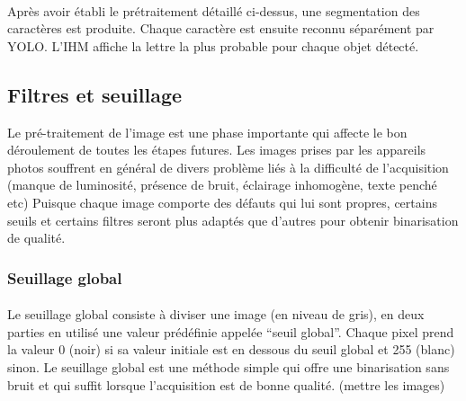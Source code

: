 \documentclass[a4paper]{article}
\begin{document}
			\paragraph{} Après avoir établi le prétraitement détaillé ci-dessus, une segmentation des caractères est produite. Chaque caractère est ensuite reconnu séparément par YOLO. L'IHM affiche la lettre la plus probable pour chaque objet détecté.


			\subsection{Filtres et seuillage}
			Le pré-traitement de l'image est une phase importante qui affecte le bon déroulement de toutes les étapes futures. Les images prises par les appareils photos souffrent en général de divers problème liés à la difficulté de l'acquisition (manque de luminosité, présence de bruit, éclairage inhomogène, texte penché etc)
			Puisque chaque image comporte des défauts qui lui sont propres, certains seuils et certains filtres seront plus adaptés que d'autres pour obtenir binarisation de qualité.
			
				\subsubsection{Seuillage global}
				
				\paragraph{} Le seuillage global consiste à diviser une image (en niveau de gris), en deux parties en utilisé une valeur prédéfinie appelée “seuil global”. Chaque pixel prend la valeur 0 (noir) si sa valeur initiale est en dessous du seuil global et 255 (blanc) sinon.
				Le seuillage global est une méthode simple qui offre une binarisation sans bruit et qui suffit lorsque l'acquisition est de bonne qualité. (mettre les images)
				
\end{document}
